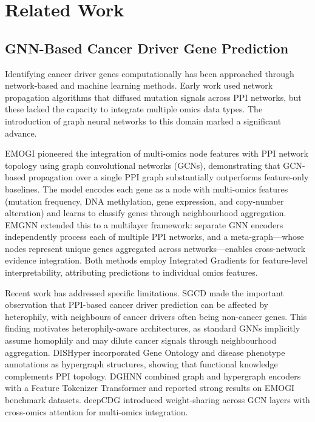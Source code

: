 
\section{Related Work}

\subsection{GNN-Based Cancer Driver Gene Prediction}

Identifying cancer driver genes computationally has been approached through
network-based and machine learning methods. Early work used network propagation
algorithms that diffused mutation signals across PPI networks, but these lacked
the capacity to integrate multiple omics data types. The introduction of graph
neural networks to this domain marked a significant advance.

EMOGI \cite{emogi2021} pioneered the integration of multi-omics node features
with PPI network topology using graph convolutional networks (GCNs),
demonstrating that GCN-based propagation over a single PPI graph substantially
outperforms feature-only baselines. The model encodes each gene as a node with
multi-omics features (mutation frequency, DNA methylation, gene expression, and
copy-number alteration) and learns to classify genes through neighbourhood
aggregation. EMGNN \cite{emgnn2023} extended this to a multilayer framework:
separate GNN encoders independently process each of multiple PPI networks, and a
meta-graph---whose nodes represent unique genes aggregated across networks---enables
cross-network evidence integration. Both methods employ Integrated Gradients for
feature-level interpretability, attributing predictions to individual omics
features.

Recent work has addressed specific limitations. SGCD \cite{sgcd2024} made the
important observation that PPI-based cancer driver prediction can be affected by
heterophily, with neighbours of cancer drivers often being non-cancer genes.
This finding motivates heterophily-aware architectures, as standard GNNs
implicitly assume homophily and may dilute cancer signals through neighbourhood
aggregation. DISHyper \cite{dishyper2024} incorporated Gene Ontology and disease
phenotype annotations as hypergraph structures, showing that functional knowledge
complements PPI topology. DGHNN \cite{dghnn2025} combined graph and hypergraph
encoders with a Feature Tokenizer Transformer and reported strong results on
EMOGI benchmark datasets. deepCDG \cite{deepcdg2025} introduced
weight-sharing across GCN layers with cross-omics attention for multi-omics
integration.

